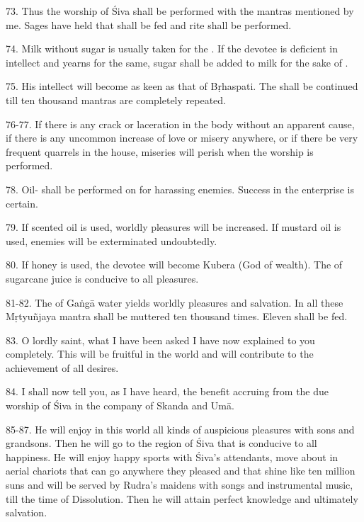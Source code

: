 73. Thus the worship of Śiva shall be performed with the mantras mentioned by me.
Sages have held that  shall be fed and  rite shall
be performed.

74. Milk without sugar is usually taken for the . If the devotee is
deficient in intellect and yearns for the same, sugar shall be added to milk for
the sake of .

75. His intellect will become as keen as that of Bṛhaspati. The  shall
be continued till ten thousand mantras are completely repeated.

76-77. If there is any crack or laceration in the body without an apparent cause,
if there is any uncommon increase of love or misery anywhere, or if there be
very frequent quarrels in the house, miseries will perish when the 
worship is performed.

78. Oil- shall be performed on  for harassing enemies.
Success in the enterprise is certain.

79. If scented oil is used, worldly pleasures will be increased. If mustard oil
is used, enemies will be exterminated undoubtedly.

80. If honey is used, the devotee will become Kubera (God of wealth).
The  of sugarcane juice is conducive to all pleasures.

81-82. The  of Gaṅgā water yields worldly pleasures and salvation. In
all these  Mṛtyuñjaya mantra shall be muttered ten thousand times.
Eleven  shall be fed.

83. O lordly saint, what I have been asked I have now explained to you
completely. This will be fruitful in the world and will contribute to
the achievement of all desires.

84. I shall now tell you, as I have heard, the benefit accruing from the due
worship of Śiva in the company of Skanda and Umā.

85-87. He will enjoy in this world all kinds of auspicious pleasures with sons
and grandsons. Then he will go to the region of Śiva that is conducive to all
happiness. He will enjoy happy sports with Śiva’s attendants, move about in
aerial chariots that can go anywhere they pleased and that shine like ten
million suns and will be served by Rudra’s maidens with songs and instrumental
music, till the time of Dissolution. Then he will attain perfect knowledge and
ultimately salvation.
